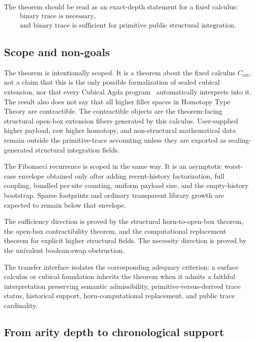 \documentclass{lmcs}
\begin{document}
The theorem should be read as an exact-depth statement for a fixed calculus:
\[
  \begin{gathered}
  \text{binary trace is necessary,}\\
  \text{and binary trace is sufficient for primitive public structural integration.}
  \end{gathered}
\]

\subsection{Scope and non-goals}
\label{subsec:scope-nongoals}

The theorem is intentionally scoped.  It is a theorem about the fixed calculus
\(C_{\mathrm{ext}}\), not a claim that this is the only possible formalization
of sealed cubical extension, nor that every Cubical Agda program~\cite{cubical-agda}
automatically interprets into it.  The result also does not say that all higher
filler spaces in Homotopy Type Theory are contractible.  The contractible
objects are the theorem-facing structural open-box extension fibers generated by
this calculus.  User-supplied higher payload, raw higher homotopy, and
non-structural mathematical data remain outside the primitive-trace accounting
unless they are exported as sealing-generated structural integration fields.

The Fibonacci recurrence is scoped in the same way.  It is an asymptotic
worst-case envelope obtained only after adding recent-history factorization,
full coupling, bundled per-site counting, uniform payload size, and the
empty-history bootstrap.  Sparse footprints and ordinary transparent library
growth are expected to remain below that envelope.

The sufficiency direction is proved by the structural horn-to-open-box theorem,
the open-box contractibility theorem, and the computational replacement theorem
for explicit higher structural fields.  The necessity direction is proved by the
univalent boolean-swap obstruction.

The transfer interface isolates the corresponding adequacy criterion: a surface
calculus or cubical foundation inherits the theorem when it admits a faithful
interpretation preserving semantic admissibility, primitive-versus-derived trace
status, historical support, horn-computational replacement, and public trace
cardinality.

\subsection{From arity depth to chronological support}
\end{document}
